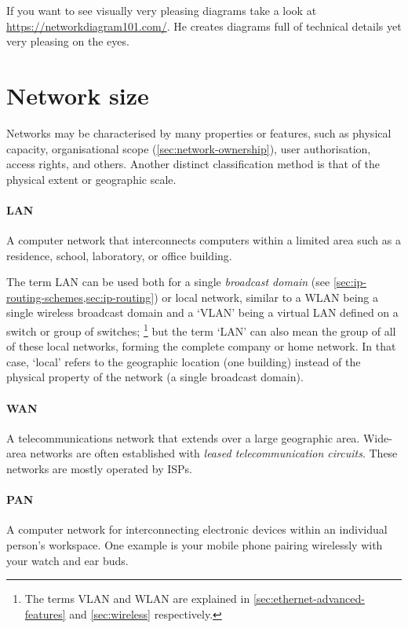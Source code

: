 If you want to see visually very pleasing diagrams take a look at \url{https://networkdiagram101.com/}.
He creates diagrams full of technical details yet very pleasing on the eyes.




\section{Network size}
\label{sec:network-size}

Networks may be characterised by many properties or features, such as physical capacity, organisational scope (\vref{sec:network-ownership}), user authorisation, access rights, and others.
Another distinct classification method is that of the physical extent or geographic scale.

\paragraph{\gls{LAN}}
A computer network that interconnects computers within a limited area such as a residence, school, laboratory, or office building.

The term \gls{LAN} can be used both for a single \emph{broadcast domain} (see \vref{sec:ip-routing-schemes,sec:ip-routing}) or local network, similar to a \acs{WLAN} being a single wireless broadcast domain and a `\acs{VLAN}' being a virtual \gls{LAN} defined on a switch or group of switches;%
   \footnote{The terms \acs{VLAN} and \acs{WLAN} are explained in \vref{sec:ethernet-advanced-features} and \vref{sec:wireless} respectively.}
but the term `\gls{LAN}' can also mean the group of all of these local networks, forming the complete company or home network.
In that case, `local' refers to the geographic location (one building) instead of the physical property of the network (a single broadcast domain).

\paragraph{\gls{WAN}}
A telecommunications network that extends over a large geographic area.
Wide-area networks are often established with \emph{leased telecommunication circuits}.
These networks are mostly operated by \glspl{ISP}.

\paragraph{\gls{PAN}}
A computer network for interconnecting electronic devices within an individual person's workspace.
One example is your mobile phone pairing wirelessly with your watch and ear buds.

